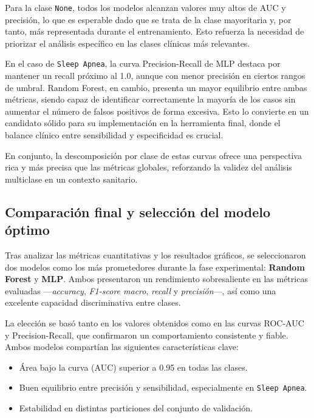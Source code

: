 Para la clase \texttt{None}, todos los modelos alcanzan valores muy altos de AUC y precisión, lo que es esperable dado que se trata de la clase mayoritaria y, por tanto, más representada durante el entrenamiento. Esto refuerza la necesidad de priorizar el análisis específico en las clases clínicas más relevantes.

En el caso de \texttt{Sleep Apnea}, la curva Precision-Recall de MLP destaca por mantener un recall próximo al 1.0, aunque con menor precisión en ciertos rangos de umbral. Random Forest, en cambio, presenta un mayor equilibrio entre ambas métricas, siendo capaz de identificar correctamente la mayoría de los casos sin aumentar el número de falsos positivos de forma excesiva. Esto lo convierte en un candidato sólido para su implementación en la herramienta final, donde el balance clínico entre sensibilidad y especificidad es crucial.

En conjunto, la descomposición por clase de estas curvas ofrece una perspectiva rica y más precisa que las métricas globales, reforzando la validez del análisis multiclase en un contexto sanitario.


\subsection{Comparación final y selección del modelo óptimo}

Tras analizar las métricas cuantitativas y los resultados gráficos, se seleccionaron dos modelos como los más prometedores durante la fase experimental: \textbf{Random Forest} y \textbf{MLP}. Ambos presentaron un rendimiento sobresaliente en las métricas evaluadas —\textit{accuracy}, \textit{F1-score macro}, \textit{recall} y \textit{precisión}—, así como una excelente capacidad discriminativa entre clases.

La elección se basó tanto en los valores obtenidos como en las curvas ROC-AUC y Precision-Recall, que confirmaron un comportamiento consistente y fiable. Ambos modelos compartían las siguientes características clave:


\begin{itemize}
    \item Área bajo la curva (AUC) superior a 0.95 en todas las clases.
    \item Buen equilibrio entre precisión y sensibilidad, especialmente en \texttt{Sleep Apnea}.
    \item Estabilidad en distintas particiones del conjunto de validación.
\end{itemize}

